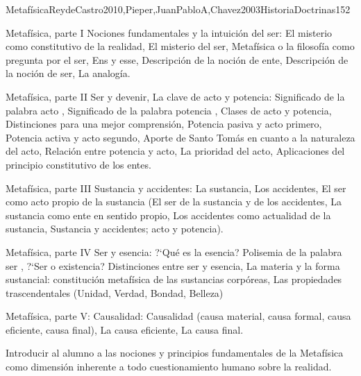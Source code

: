 \begin{syllabus}
\begin{unit}{Metafísica}{ReydeCastro2010,Pieper,JuanPabloA,Chavez2003HistoriaDoctrinas}{15}{2}
\begin{topics}
	\item Metafísica, parte I  Nociones fundamentales y la intuición del ser: El misterio como constitutivo de la realidad, El misterio del ser, Metafísica o la filosofía como pregunta por el ser, Ens y esse, Descripción de la noción de ente, Descripción de la noción de ser, La analogía.
	\item Metafísica, parte II  Ser y devenir, La clave de acto y potencia: Significado de la palabra  acto , Significado de la palabra  potencia , Clases de acto y potencia, Distinciones para una mejor comprensión, Potencia pasiva y acto primero, Potencia activa y acto segundo, Aporte de Santo Tomás en cuanto a la naturaleza del acto, Relación entre potencia y acto, La prioridad del acto, Aplicaciones del principio constitutivo de los entes.
	\item Metafísica, parte III  Sustancia y accidentes: La sustancia, Los accidentes, El ser como acto propio de la sustancia (El ser de la sustancia y de los accidentes, La sustancia como ente en sentido propio, Los accidentes como actualidad de la sustancia, Sustancia y accidentes; acto y potencia).
	\item Metafísica, parte IV  Ser y esencia: ?`Qué es la esencia? Polisemia de la palabra  ser , ?`Ser o existencia? Distinciones entre ser y esencia, La materia y la forma sustancial: constitución metafísica de las sustancias corpóreas, Las propiedades trascendentales (Unidad, Verdad, Bondad, Belleza)
	\item Metafísica, parte V: Causalidad: Causalidad (causa material, causa formal, causa eficiente, causa final), La causa eficiente, La causa final.
\end{topics}

\begin{learningoutcomes}
	\item Introducir al alumno a las nociones y principios fundamentales de la Metafísica como dimensión inherente a todo cuestionamiento humano sobre la realidad.
\end{learningoutcomes}
\end{unit}



\begin{coursebibliography}
\end{coursebibliography}

\end{syllabus}
